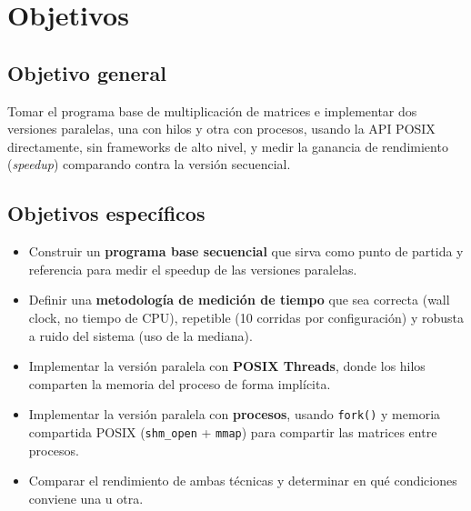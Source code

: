 \section{Objetivos}

\subsection{Objetivo general}

Tomar el programa base de multiplicación de matrices e implementar dos versiones paralelas, una con hilos y otra con procesos, usando la API POSIX directamente, sin frameworks de alto nivel, y medir la ganancia de rendimiento (\textit{speedup}) comparando contra la versión secuencial.

\subsection{Objetivos específicos}

\begin{itemize}
    \item Construir un \textbf{programa base secuencial} que sirva como punto de partida y referencia para medir el speedup de las versiones paralelas.
    \item Definir una \textbf{metodología de medición de tiempo} que sea correcta (wall clock, no tiempo de CPU), repetible (10 corridas por configuración) y robusta a ruido del sistema (uso de la mediana).
    \item Implementar la versión paralela con \textbf{POSIX Threads}, donde los hilos comparten la memoria del proceso de forma implícita.
    \item Implementar la versión paralela con \textbf{procesos}, usando \texttt{fork()} y memoria compartida POSIX (\texttt{shm\_open} + \texttt{mmap}) para compartir las matrices entre procesos.
    \item Comparar el rendimiento de ambas técnicas y determinar en qué condiciones conviene una u otra.
\end{itemize}